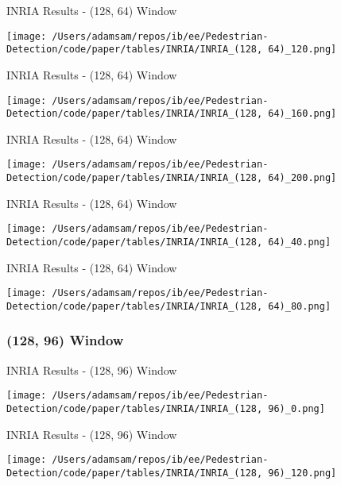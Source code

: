 \begin{table}
    \caption{INRIA Results - (128, 64) Window}
    \texttt{[image: /Users/adamsam/repos/ib/ee/Pedestrian-Detection/code/paper/tables/INRIA/INRIA\_(128, 64)\_120.png]}
    \label{tab:INRIA_(128, 64)_120}
\end{table}

\begin{table}
    \caption{INRIA Results - (128, 64) Window}
    \texttt{[image: /Users/adamsam/repos/ib/ee/Pedestrian-Detection/code/paper/tables/INRIA/INRIA\_(128, 64)\_160.png]}
    \label{tab:INRIA_(128, 64)_160}
\end{table}

\begin{table}
    \caption{INRIA Results - (128, 64) Window}
    \texttt{[image: /Users/adamsam/repos/ib/ee/Pedestrian-Detection/code/paper/tables/INRIA/INRIA\_(128, 64)\_200.png]}
    \label{tab:INRIA_(128, 64)_200}
\end{table}

\begin{table}
    \caption{INRIA Results - (128, 64) Window}
    \texttt{[image: /Users/adamsam/repos/ib/ee/Pedestrian-Detection/code/paper/tables/INRIA/INRIA\_(128, 64)\_40.png]}
    \label{tab:INRIA_(128, 64)_40}
\end{table}

\begin{table}
    \caption{INRIA Results - (128, 64) Window}
    \texttt{[image: /Users/adamsam/repos/ib/ee/Pedestrian-Detection/code/paper/tables/INRIA/INRIA\_(128, 64)\_80.png]}
    \label{tab:INRIA_(128, 64)_80}
\end{table}

\subsubsection*{(128, 96) Window}

\begin{table}
    \caption{INRIA Results - (128, 96) Window}
    \texttt{[image: /Users/adamsam/repos/ib/ee/Pedestrian-Detection/code/paper/tables/INRIA/INRIA\_(128, 96)\_0.png]}
    \label{tab:INRIA_(128, 96)_0}
\end{table}

\begin{table}
    \caption{INRIA Results - (128, 96) Window}
    \texttt{[image: /Users/adamsam/repos/ib/ee/Pedestrian-Detection/code/paper/tables/INRIA/INRIA\_(128, 96)\_120.png]}
    \label{tab:INRIA_(128, 96)_120}
\end{table}

